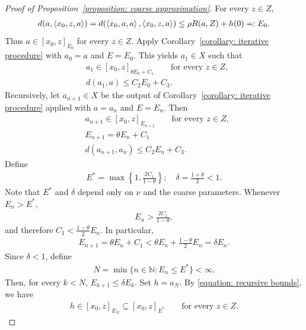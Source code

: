\documentclass[10pt,a4paper]{amsart}
\newcommand{\N}{\mathbb{N}}
\begin{document}
\begin{proof}[Proof of Proposition~\ref{proposition: coarse approximation}]
    For every $z\in Z$,
    \begin{align*}
        d(a,\braket{x_0,z,a})=d(\braket{x_0,a,a},\braket{x_0,z,a})\le\rho R(a,Z)+h(0)=:E_0.
    \end{align*}
    Thus $a\in[x_0,z]_{E_0}$ for every $z\in Z$.
    Apply Corollary~\ref{corollary: iterative procedure} with $a_0=a$ and $E=E_0$. This yields $a_1\in X$ such that
    \begin{align*}
        &a_1\in [x_0,z]_{\theta E_0+C_1}\qquad\text{for every }z\in Z,\\
        &d(a_1,a)\le C_2E_0+C_3.
    \end{align*}
    Recursively, let $a_{n+1}\in X$ be the output of Corollary~\ref{corollary: iterative procedure} applied with $a=a_n$ and $E=E_n$. Then
    \begin{equation}
    \label{equation: recursive bounds}
    \begin{aligned}
        &a_{n+1}\in [x_0,z]_{E_{n+1}}\qquad\text{for every }z\in Z,\\
        &E_{n+1}=\theta E_n+C_1\\
        &d(a_{n+1},a_{n})\le C_2 E_n+C_3.
    \end{aligned}      
    \end{equation}
    Define
    \begin{align*}
        E^*=\max \left\{1,\frac{2C_1}{1-\theta}\right\};\quad \delta=\frac{1+\theta}{2}<1.
    \end{align*}
    Note that $E^*$ and $\delta$ depend only on $\nu$ and the coarse parameters.
    Whenever $E_n>E^*$,
    \begin{align*}
        E_n>\frac{2C_1}{1-\theta},
    \end{align*}
    and therefore $C_1< \frac{1-\theta}{2}E_n$. In particular,
    \begin{align*}
        E_{n+1}=\theta E_n+C_1< \theta E_n+\frac{1-\theta}{2}E_n=\delta E_n.
    \end{align*}
    Since $\delta<1$, define
    \begin{align*}
        N=\min\{n\in \N: E_n \le E^*\}<\infty.
    \end{align*}
    Then, for every $k<N$, $E_{k+1}\le \delta E_k$.
    Set $h=a_N$.
    By \eqref{equation: recursive bounds}, we have
    \begin{align*}
        h\in [x_0,z]_{E_N}\subseteq [x_0,z]_{E^*}\qquad\text{for every }z\in Z.

\end{align*}
\end{proof}
\end{document}

